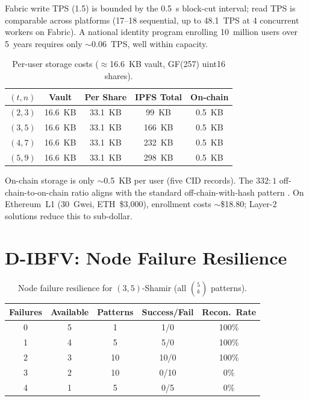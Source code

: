 Fabric write TPS (1.5) is bounded by the 0.5~s block-cut interval; read TPS is
comparable across platforms (17--18 sequential, up to 48.1~TPS at 4 concurrent
workers on Fabric). A national identity program enrolling 10~million users over
5~years requires only $\sim$0.06~TPS, well within capacity.

\begin{table}[h]
\centering
\caption{Per-user storage costs ($\approx$16.6~KB vault, GF(257) uint16 shares).}
\label{tab:storage_costs}
\small
\begin{tabular}{@{}c cccc@{}}
\toprule
$(t,n)$ & \textbf{Vault} & \textbf{Per Share} & \textbf{IPFS Total} & \textbf{On-chain} \\
\midrule
$(2,3)$ & 16.6~KB & 33.1~KB & 99~KB  & 0.5~KB \\
$(3,5)$ & 16.6~KB & 33.1~KB & 166~KB & 0.5~KB \\
$(4,7)$ & 16.6~KB & 33.1~KB & 232~KB & 0.5~KB \\
$(5,9)$ & 16.6~KB & 33.1~KB & 298~KB & 0.5~KB \\
\bottomrule
\end{tabular}
\end{table}

On-chain storage is only $\sim$0.5~KB per user (five CID records). The
$332{:}1$ off-chain-to-on-chain ratio aligns with the standard off-chain-with-hash
pattern \cite{acquah2020securing}. On Ethereum~L1 (30~Gwei, ETH~\$3{,}000),
enrollment costs $\sim$\$18.80; Layer-2 solutions reduce this to sub-dollar.

\section{D-IBFV: Node Failure Resilience}
\label{sec:node_failure_exp}

\begin{table}[h]
\centering
\caption{Node failure resilience for $(3,5)$-Shamir (all $\binom{5}{k}$ patterns).}
\label{tab:node_failure}
\small
\begin{tabular}{@{}ccccc@{}}
\toprule
\textbf{Failures} & \textbf{Available} & \textbf{Patterns} &
\textbf{Success/Fail} & \textbf{Recon.\ Rate} \\
\midrule
0 & 5 & 1  & 1/0  & 100\% \\
1 & 4 & 5  & 5/0  & 100\% \\
2 & 3 & 10 & 10/0 & 100\% \\
3 & 2 & 10 & 0/10 & 0\%   \\
4 & 1 & 5  & 0/5  & 0\%   \\
\bottomrule
\end{tabular}
\end{table}

